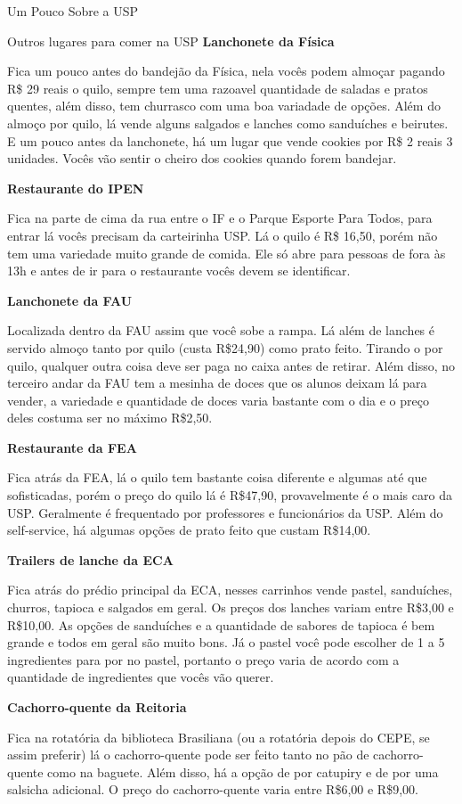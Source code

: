 \begin{secao}{Um Pouco Sobre a USP}
\begin{subsecao}{Outros lugares para comer na USP}
{\bf Lanchonete da Física}

Fica um pouco antes do bandejão da Física, nela vocês podem almoçar pagando R\$ 29 reais o
quilo, sempre tem uma razoavel quantidade de saladas e pratos quentes, além disso, tem
churrasco com uma boa variadade de opções.
Além do almoço por quilo, lá vende alguns salgados e lanches como sanduíches e beirutes.
E um pouco antes da lanchonete, há um lugar que vende cookies por R\$ 2 reais 3 unidades.
Vocês vão sentir o cheiro dos cookies quando forem bandejar.

{\bf Restaurante do IPEN}

Fica na parte de cima da rua entre o IF e o Parque Esporte Para Todos, para entrar lá vocês
precisam da carteirinha USP. Lá o quilo é R\$ 16,50, porém não tem uma variedade muito grande
de comida. Ele só abre para pessoas de fora às 13h e antes de ir para o restaurante vocês devem
se identificar.

{\bf Lanchonete da FAU}

Localizada dentro da FAU assim que você sobe a rampa. Lá além de lanches é servido almoço
tanto por quilo (custa R\$24,90) como prato feito. Tirando o por quilo, qualquer outra coisa
deve ser paga no caixa antes de retirar. Além disso, no terceiro andar da FAU tem a mesinha
de doces que os alunos deixam lá para vender, a variedade e quantidade de doces varia bastante
com o dia e o preço deles costuma ser no máximo R\$2,50.

{\bf Restaurante da FEA}

Fica atrás da FEA, lá o quilo tem bastante coisa diferente e algumas até que sofisticadas,
porém o preço do quilo lá é R\$47,90, provavelmente é o mais caro da USP. Geralmente
é frequentado por professores e funcionários da USP. Além do self-service, há algumas opções
de prato feito que custam R\$14,00.

{\bf Trailers de lanche da ECA}

Fica atrás do prédio principal da ECA, nesses carrinhos vende pastel, sanduíches, churros,
tapioca e salgados em geral. Os preços dos lanches variam entre R\$3,00 e R\$10,00. As opções de
sanduíches e a quantidade de sabores de tapioca é bem grande e todos em geral são muito bons.
Já o pastel você pode escolher de 1 a 5 ingredientes para por no pastel, portanto o preço
varia de acordo com a quantidade de ingredientes que vocês vão querer.

{\bf Cachorro-quente da Reitoria}

Fica na rotatória da biblioteca Brasiliana (ou a rotatória depois do CEPE, se assim preferir)
lá o cachorro-quente pode ser feito tanto no pão de cachorro-quente como na baguete. Além disso,
há a opção de por catupiry e de por uma salsicha adicional. O preço do cachorro-quente varia
entre R\$6,00 e R\$9,00.

\end{subsecao}

\end{secao}
